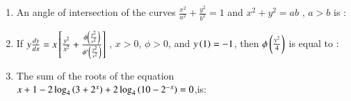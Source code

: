 \documentclass[journal]{IEEEtran}
\begin{document}
\begin{enumerate}[start=1]
\newpage
\item %
An angle of intersection of the curves $\frac{x^2}{a^2}+\frac{y^2}{b^2}=1$ and $x^2+y^2=ab$ , $a > b$ is :
\begin{enumerate}
\end{enumerate}
\begin{enumerate}
\end{enumerate}
\item %
If $y\frac{dy}{dx}=x{}\left[\frac{y^2}{x^2}+\frac{\phi\left(\frac{y^2}{x^2}\right)}{\phi'\left(\frac{y^2}{x^2}\right)}\right]$ , $x>0$, $\phi >0$, and $y\left(1\right)=-1$, then $\phi\left(\frac{y^2}{4}\right)$ is equal to :
\begin{enumerate}
\end{enumerate}
\begin{enumerate}
\end{enumerate}
\item %
The sum of the roots of the equation \\ 
$x+1-2\log_4 \left(3+2^x\right)+2\log_4 \left(10-2^{-x}\right)=0$,is:
\begin{enumerate}
\end{enumerate}
\begin{enumerate}
\end{enumerate}
\end{enumerate}
\end{document}
